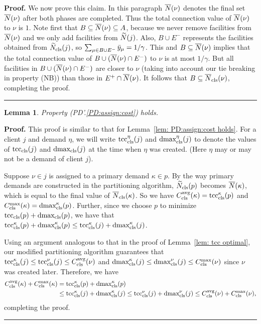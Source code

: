 \documentclass[oneside,final]{ucr}
\newtheorem{lemma}[theorem]{Lemma}
\newenvironment{proof}[1][Proof]{\textbf{#1.} }{\ \rule{0.5em}{0.5em}}
\begin{document}
\begin{proof}
  We now prove this claim. In this paragraph $\wbarN(\nu)$ denotes the
  final set $\wbarN(\nu)$ after both phases are completed. Thus the total
connection value of $\wbarN(\nu)$ to $\nu$ is $1$.
	Note first that
  $B\subseteq \wbarN(\nu) \subseteq A$, because we never remove
  facilities from $\wbarN(\nu)$ and we only add facilities from
  $\wtildeN(j)$.  Also, $B\cup E^-$ represents the facilities obtained
  from $\wtildeclsnb(j)$, so $\sum_{\mu\in B\cup E^-} \bary_{\mu} =
  1/\gamma$.  This and $B\subseteq \wbarN(\nu)$ implies that the total
  connection value of $B\cup (\wbarN(\nu)\cap E^-)$ to $\nu$ is at
  most $1/\gamma$. But all facilities in $B\cup (\wbarN(\nu)\cap E^-)$
  are closer to $\nu$ (taking into account our tie breaking in property (NB))
 	than those in $E^+\cap \wbarN(\nu)$. It follows
  that $B\subseteq \wbarclsnb(\nu)$, completing the proof.
\end{proof}


\begin{lemma}\label{lem: PD1: primary optimal}
  Property (PD'.\ref{PD:assign:cost}) holds.
\end{lemma}

\begin{proof}
This proof is similar to that for Lemma~\ref{lem: PD:assign:cost holds}.
For a client $j$ and demand $\eta$, we will write
$\tcccls^\eta(j)$ and $\dmaxcls^\eta(j)$ to denote the values of
$\tcccls(j)$ and $\dmaxcls(j)$ at the time when $\eta$
was created. (Here $\eta$ may or may not be a demand of client $j$).

Suppose $\nu \in j$ is assigned to a primary demand $\kappa \in p$.
By the way primary demands are constructed in the partitioning
algorithm, $\wtildeclsnb(p)$ becomes $\wbarN(\kappa)$, which is equal
to the final value of $\wbarclsnb(\kappa)$. So we have
$\clsdist(\kappa) = \tcccls^\kappa (p)$ and $\clsmax(\kappa) =
\dmaxcls^\kappa(p)$. Further, since we choose $p$ to minimize
$\tcccls(p) + \dmaxcls(p)$, we have that $\tcccls^\kappa(p) +
\dmaxcls^\kappa(p) \leq \tcccls^\kappa(j) + \dmaxcls^\kappa(j)$.

Using an argument analogous to that in the proof of Lemma~\ref{lem: tcc optimal}, 
our modified partitioning algorithm guarantees that
  $\tcccls^{\kappa}(j) \leq \tcccls^{\nu}(j) \leq \clsdist(\nu)$ and
  $\dmaxcls^{\kappa}(j) \leq \dmaxcls^{\nu}(j) \leq \clsmax(\nu)$ since $\nu$ was
  created later.
  Therefore, we have
%
  \begin{align*}
    \clsdist(\kappa) + \clsmax(\kappa) &= \tcccls^{\kappa}(p) +	\dmaxcls^{\kappa}(p) 
					\\
					&\leq \tcccls^{\kappa}(j) + \dmaxcls^{\kappa}(j) 
					\leq \tcccls^{\nu}(j) + \dmaxcls^{\nu}(j) 
					\leq \clsdist(\nu) + \clsmax(\nu),
  \end{align*}
%
completing the proof.
\end{proof}
\end{document}
